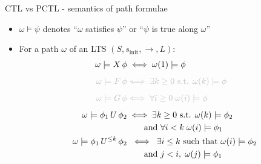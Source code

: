 \documentclass[dvipsnames]{beamer}
\begin{document}
\begin{frame}{CTL vs PCTL - semantics of path formulae}

    \begin{itemize}
        \item[] $\omega \models \psi$ denotes ``$\omega$ satisfies $\psi$'' or ``$\psi$ is true along $\omega$''
              \vspace{1em}

        \item[] For a path $\omega$ of an LTS $(S,s_{\text{init}},\rightarrow,L)$:
              \begin{align*}
                  \omega \models X\,\phi
                   & \iff \omega(1) \models \phi                                                        \\[0.5em]
                  \textcolor{lightgray}{\omega \models F\,\phi}
                   & \textcolor{lightgray}{\iff \exists k \geq 0 \text{ s.t. } \omega(k) \models \phi } \\[0.5em]
                  \textcolor{lightgray}{\omega \models G\,\phi}
                   & \textcolor{lightgray}{\iff \forall i \geq 0 \; \omega(i) \models \phi }            \\[0.5em]
                  \omega \models \phi_1 \, U \, \phi_2
                   & \iff \exists k \geq 0 \text{ s.t. } \omega(k) \models \phi_2                       \\
                   & \qquad \text{and } \forall i < k \; \omega(i) \models \phi_1                       \\
                  \omega \models \phi_1 \, U^{\leq k} \, \phi_2
                   & \;\iff\;
                  \exists i \leq k \text{ such that } \omega(i) \models \phi_2                          \\
                   & \qquad \text{and } j < i,\; \omega(j) \models \phi_1
              \end{align*}

    \end{itemize}

\end{frame}
\end{document}
